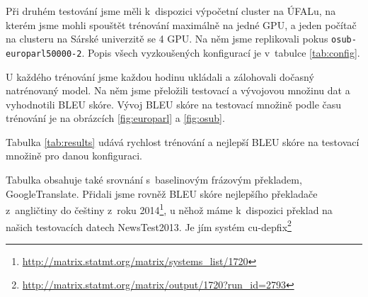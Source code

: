 \documentclass[a4]{article}
\def\furl#1{\footnote{\url{#1}}}
\begin{document}
Při druhém testování jsme měli k~dispozici výpočetní cluster na ÚFALu, na
kterém jsme mohli spouštět trénování maximálně na jedné GPU, a jeden počítač na
clusteru na Sárské univerzitě se 4 GPU. Na něm jsme replikovali pokus
\texttt{osub-europarl50000-2}. Popis všech vyzkoušených konfigurací je v~tabulce 
\ref{tab:config}. 

U každého trénování jsme každou hodinu ukládali a zálohovali dočasný natrénovaný
model. Na něm jsme přeložili testovací a vývojovou množinu dat a vyhodnotili
BLEU skóre. Vývoj BLEU skóre na testovací množině podle času trénování je na
obrázcích \ref{fig:europarl} a \ref{fig:osub}.


Tabulka \ref{tab:results} udává rychlost trénování a nejlepší BLEU skóre na testovací
množině pro danou konfiguraci. 

Tabulka obsahuje také srovnání s~baselinovým frázovým překladem,
GoogleTranslate.
Přidali jsme rovněž BLEU skóre nejlepšího překladače z~angličtiny do češtiny
z~roku 2014\furl{http://matrix.statmt.org/matrix/systems_list/1720}, u něhož
máme k~dispozici překlad na našich testovacích datech NewsTest2013. Je jím systém
cu-depfix\furl{http://matrix.statmt.org/matrix/output/1720?run_id=2793}

\end{document}
